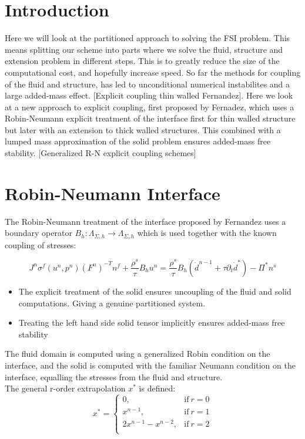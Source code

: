 


\section*{Introduction}
Here we will look at the partitioned approach to solving the FSI problem. This means splitting our scheme into parts where we solve the fluid, structure and extension problem in different steps. This is to greatly reduce the size of the computational cost, and hopefully increase speed. So far the methods for coupling of the fluid and structure, has led to unconditional numerical instabilites and a large added-mass effect. [Explicit coupling thin walled Fernandez]. Here we look at a new approach to explicit coupling, first proposed by Fernadez, which uses a Robin-Neumann explicit treatment of the interface first for thin walled structure but later with an extension to thick walled structures. This combined with a lumped mass approximation of the solid problem ensures added-mass free stability. [Generalized R-N explicit coupling schemes]

\section*{Robin-Neumann Interface}
The Robin-Neumann treatment of the interface proposed by Fernandez uses a boundary operator $ B_h : \Lambda_{\Sigma, h} \rightarrow \Lambda_{\Sigma, h}  $ which is used together with the known coupling of stresses:

$$  J^n \sigma^f(u^n, p^n)(F^n)^{-T}n^f + \frac{\rho^s}{\tau} B_h u^n = \frac{\rho^s}{\tau} B_h (\dot{d}^{n-1} + \tau \partial_t \dot{d}^*  ) - \Pi^{*} n^s $$
\begin{itemize}  
\item The explicit treatment of the solid ensures uncoupling of the fluid and solid computations. Giving a genuine partitioned system. 
\item Treating the left hand side solid tensor implicitly ensures added-mass free stability
\end{itemize}
The fluid domain is computed using a generalized Robin condition on the interface, and the solid is computed with the familiar Neumann condition on the interface, equalling the stresses from the fluid and structure.\\
The general r-order extrapolation $x^*$ is defined: 
\begin{equation}
    x^*=
    \begin{cases}
      0, & \text{if}\ r=0 \\
      x^{n-1}, & \text{if}\ r =1 \\
      2x^{n-1} - x^{n-2}, & \text{if}\ r =2 \\
    \end{cases}
\end{equation}


